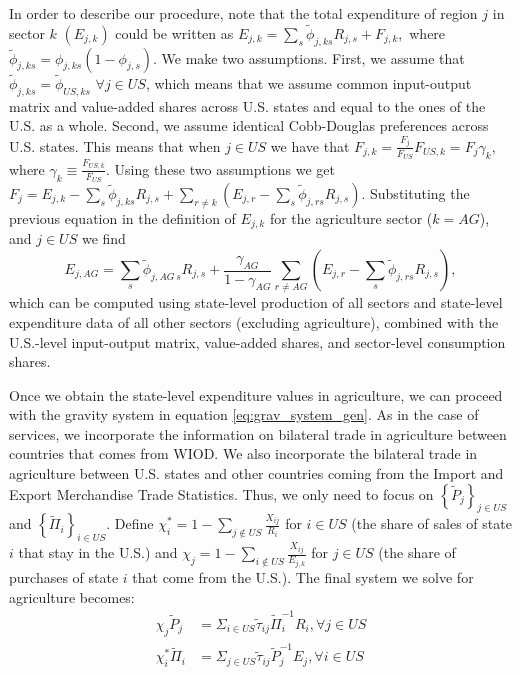 \documentclass[12pt]{article}
\newcommand{\bs}{\small \begin{eqnarray*}}
\newcommand{\es}{\end{eqnarray*}}
\begin{document}
In order to describe our procedure, note that the total expenditure of region $j$ in sector $k$ $(E_{j,k})$ could be written as  $E_{j,k}=\sum_{s}\tilde{\phi}_{j,ks}R_{j,s}+F_{j,k},$ where $\tilde{\phi}_{j,ks}=\phi_{j,ks}(1-\phi_{j,s})$. We make two assumptions. First, we assume that $\tilde{\phi}_{j,ks}=\tilde{\phi}_{US,ks}$ $\forall j\in US$, which means that we assume common input-output matrix and value-added shares across U.S. states and equal to the ones of the U.S. as a whole. Second, we assume identical Cobb-Douglas preferences across U.S. states. This means that when $j\in US$ we have that $F_{j,k}=\tfrac{F_{j}}{F_{US}} F_{US,k}=F_{j}\gamma_{k}$, where $\gamma_{k}\equiv\tfrac{F_{US,k}}{F_{US}}$. Using these two assumptions we get $F_{j}= E_{j,k}-\sum_{s}\tilde{\phi}_{j,ks}R_{j,s}+\sum_{r\neq k}\left(E_{j,r}-\sum_{s}\tilde{\phi}_{j,rs}R_{j,s}\right).$ Substituting the previous equation in the definition of $E_{j,k}$ for the agriculture sector ($k=AG$), and $j\in US$ we find $$E_{j,AG}=\sum_{s}\tilde{\phi}_{j,AG\,s}R_{j,s}+\dfrac{\gamma_{AG}}{1-\gamma_{AG}}\sum_{r\neq AG}\left(E_{j,r}-\sum_{s}\tilde{\phi}_{j,rs}R_{j,s}\right),$$ which can be computed using state-level production of all sectors and state-level expenditure data of all other sectors (excluding agriculture), combined with the U.S.-level input-output matrix, value-added shares, and sector-level consumption shares. 

Once we obtain the state-level expenditure values in agriculture, we can proceed with the gravity system in equation \eqref{eq:grav_system_gen}. As in the case of services, we incorporate the information on bilateral trade in agriculture between countries that comes from WIOD. We also incorporate the bilateral trade in agriculture between U.S. states and other countries coming from the Import and Export Merchandise Trade Statistics. Thus, we only need to focus on $\left\{ \tilde{P}_{j}\right\}_{j\in US}$  and $\left\{ \tilde{\Pi}_{i}\right\}_{i\in US}$.  Define $\chi^{*}_{i}=1-\sum_{j\notin US}\tfrac{X_{ij}}{R_{i}}$ for $i\in US$ (the share of sales of state $i$ that stay in the U.S.) and $\chi_{j}=1-\sum_{i\notin US}\tfrac{X_{ij}}{E_{j,k}}$ for $j\in US$ (the share of purchases of state $i$ that come from the U.S.). The final system we solve for agriculture becomes:  
\bs
\chi_{j}\tilde{P}_{j} & =\Sigma_{i\in US}\tilde{\tau}_{ij}\tilde{\Pi}_{i}^{-1}R_{i},\forall j\in US \\
\chi^{*}_{i}\tilde{\Pi}_{i} & =\Sigma_{j\in US}\tilde{\tau}_{ij}\tilde{P}_{j}^{-1}E_{j},\forall i\in US
\es
\end{document}
